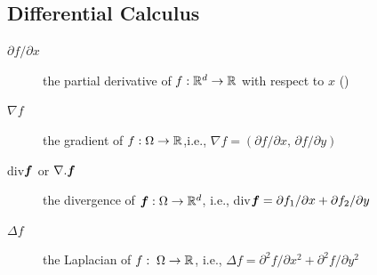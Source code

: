 \documentclass[a4paper,twoside,12pt]{book}
\def\vec#1{\mbox{\boldmath $#1$}}
\def\p{\partial}
\begin{document}
\subsection{Differential Calculus}
\begin{description}
  \item[$\p f/\p x$] the partial derivative of $f:\mathbb{R}^d\to \mathbb{R}$ with respect to $x$ ()
  \item[$\nabla f$] the gradient of $f:\Omega\to \mathbb{R}$,i.e., $\nabla f=(\p f/\p x,\, \p f/\p y)$
  \item[div$\vec{f}$ or $\nabla.\vec{f}$] the divergence of $\vec{f}:\Omega\to \R^d$, i.e., div$\vec{f}=\p f_1/\p x+\p f_2/\p y$
  \item[$\Delta f$] the Laplacian of $f:\; \Omega\to \mathbb{R}$, i.e.,
  $\Delta f=\p^2f/\p x^2+\p^2 f/\p y^2$
\end{description}
\end{document}
